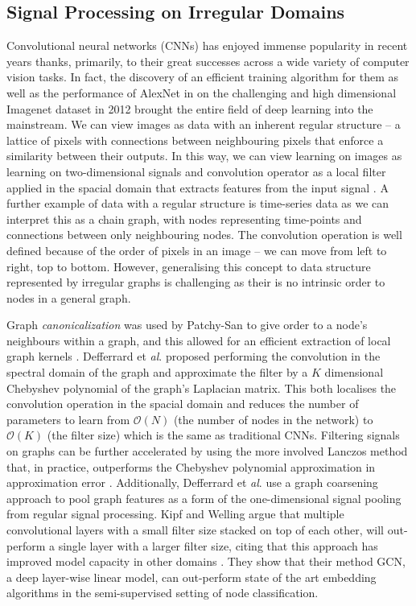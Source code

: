 \documentclass{IEEEtran}
\begin{document}
	\subsection{Signal Processing on Irregular Domains}
	Convolutional neural networks (CNNs) has enjoyed immense popularity in recent years thanks, primarily, to their great successes across a wide variety of computer vision tasks. 
	In fact, the discovery of an efficient training algorithm for them as well as the performance of AlexNet in on the challenging and high dimensional Imagenet dataset in 2012 \cite{krizhevsky2012imagenet} brought the entire field of deep learning into the mainstream.
	We can view images as data with an inherent regular structure -- a lattice of pixels with connections between neighbouring pixels that enforce a similarity between their outputs. 
	In this way, we can view learning on images as learning on two-dimensional signals and convolution operator as a local filter applied in the spacial domain that extracts features from the input signal \cite{defferrard2016convolutional}.
	A further example of data with a regular structure is time-series data as we can interpret this as a chain graph, with nodes representing time-points and connections between only neighbouring nodes. 
	The convolution operation is well defined because of the order of pixels in an image -- we can move from left to right, top to bottom.
	However, generalising this concept to data structure represented by irregular graphs is challenging as their is no intrinsic order to nodes in a general graph.
	
	Graph \textit{canonicalization} was used by Patchy-San to give order to a node's neighbours within a graph, and this allowed for an efficient extraction of local graph kernels \cite{niepert2016learning}.
	Defferrard et \textit{al}. \cite{defferrard2016convolutional} proposed performing the convolution in the spectral domain of the graph and approximate the filter by a $K$ dimensional Chebyshev polynomial of the graph's Laplacian matrix. 
	This both localises the convolution operation in the spacial domain and reduces the number of parameters to learn from $\mathcal{O}(N)$ (the number of nodes in the network) to $\mathcal{O}(K)$ (the filter size) which is the same as traditional CNNs. 
	Filtering signals on graphs can be further accelerated by using the more involved Lanczos method that, in practice, outperforms the Chebyshev polynomial approximation in approximation error \cite{susnjara2015accelerated}.
	Additionally, Defferrard et \textit{al}. use a graph coarsening approach to pool graph features as a form of the one-dimensional signal pooling from regular signal processing. 
	Kipf and Welling \cite{kipf2016semi} argue that multiple convolutional layers with a small filter size stacked on top of each other, will out-perform a single layer with a larger filter size, citing that this approach has improved model capacity in other domains \cite{he2016deep}. 
	They show that their method GCN, a deep layer-wise linear model, can out-perform state of the art embedding algorithms in the semi-supervised setting of node classification.
	
\end{document}
